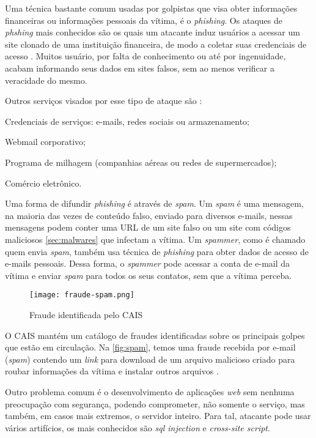 Uma técnica bastante comum usadas por golpistas que visa obter informações financeiras ou informações pessoais da vítima, é o \textit{phishing}. Os ataques de \textit{phshing} mais conhecidos são os quais um atacante induz usuários a acessar um site clonado de uma instituição financeira, de modo a coletar suas credenciais de acesso \cite{esr:tratamento}. Muitos usuário, por falta de conhecimento ou até por ingenuidade, acabam informando seus dados em sites falsos, sem ao menos verificar a veracidade do mesmo.

Outros serviços visados por esse tipo de ataque são \cite{esr:tratamento}:
\begin{alineas}
\item Credenciais de serviços: e-mails, redes sociais ou armazenamento;
\item Webmail corporativo; 
\item Programa de milhagem (companhias aéreas ou redes de supermercados);
\item Comércio eletrônico.
\end{alineas}

Uma forma de difundir \textit{phishing} é através de \textit{spam}. Um \textit{spam} é uma mensagem, na maioria das vezes de conteúdo falso, enviado para diversos e-mails, nessas mensagens podem conter uma URL de um site falso ou um site com códigos maliciosos \autoref{sec:malwares} que infectam a vítima. Um \textit{spammer}, como é chamado quem envia \textit{spam}, também usa técnica de \textit{phishing} para obter dados de acesso de e-mails pessoais. Dessa forma, o \textit{spammer} pode acessar a conta de e-mail da vítima e enviar \textit{spam} para todos os seus contatos, sem que a vítima perceba.

\begin{figure}[!htb]
 \centering
 \caption{Fraude identificada pelo CAIS}
 \texttt{[image: fraude-spam.png]}
 \label{fig:spam}
\end{figure}

O CAIS mantém um catálogo de fraudes identificadas sobre os principais golpes que estão em circulação. Na \autoref{fig:spam}, temos uma fraude recebida por e-mail (\textit{spam}) contendo um \textit{link} para download de um arquivo malicioso criado para roubar informações da vítima e instalar outros arquivos \cite{cais}.

Outro problema comum é o desenvolvimento de aplicações \textit{web} sem nenhuma preocupação com segurança, podendo comprometer, não somente o serviço, mas também, em casos mais extremos, o servidor inteiro. Para tal, atacante pode usar vários artifícios, os mais conhecidos são \textit{sql injection} e \textit{cross-site script}.

